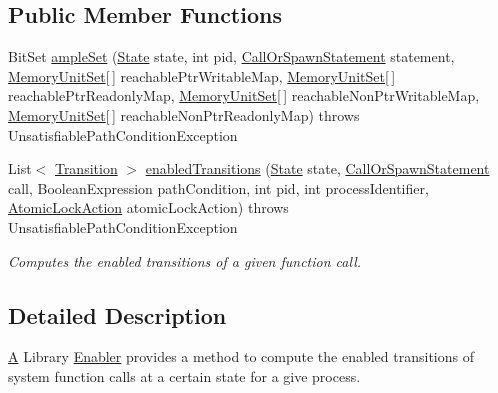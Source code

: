 \subsection*{Public Member Functions}
\begin{DoxyCompactItemize}
\item 
Bit\+Set \hyperlink{interfaceedu_1_1udel_1_1cis_1_1vsl_1_1civl_1_1kripke_1_1IF_1_1LibraryEnabler_ae19c97894a80b1965211330453c9d34b}{ample\+Set} (\hyperlink{interfaceedu_1_1udel_1_1cis_1_1vsl_1_1civl_1_1state_1_1IF_1_1State}{State} state, int pid, \hyperlink{interfaceedu_1_1udel_1_1cis_1_1vsl_1_1civl_1_1model_1_1IF_1_1statement_1_1CallOrSpawnStatement}{Call\+Or\+Spawn\+Statement} statement, \hyperlink{interfaceedu_1_1udel_1_1cis_1_1vsl_1_1civl_1_1state_1_1IF_1_1MemoryUnitSet}{Memory\+Unit\+Set}\mbox{[}$\,$\mbox{]} reachable\+Ptr\+Writable\+Map, \hyperlink{interfaceedu_1_1udel_1_1cis_1_1vsl_1_1civl_1_1state_1_1IF_1_1MemoryUnitSet}{Memory\+Unit\+Set}\mbox{[}$\,$\mbox{]} reachable\+Ptr\+Readonly\+Map, \hyperlink{interfaceedu_1_1udel_1_1cis_1_1vsl_1_1civl_1_1state_1_1IF_1_1MemoryUnitSet}{Memory\+Unit\+Set}\mbox{[}$\,$\mbox{]} reachable\+Non\+Ptr\+Writable\+Map, \hyperlink{interfaceedu_1_1udel_1_1cis_1_1vsl_1_1civl_1_1state_1_1IF_1_1MemoryUnitSet}{Memory\+Unit\+Set}\mbox{[}$\,$\mbox{]} reachable\+Non\+Ptr\+Readonly\+Map)  throws Unsatisfiable\+Path\+Condition\+Exception
\item 
List$<$ \hyperlink{interfaceedu_1_1udel_1_1cis_1_1vsl_1_1civl_1_1semantics_1_1IF_1_1Transition}{Transition} $>$ \hyperlink{interfaceedu_1_1udel_1_1cis_1_1vsl_1_1civl_1_1kripke_1_1IF_1_1LibraryEnabler_a7048d9901abda3f7af09cf3827523471}{enabled\+Transitions} (\hyperlink{interfaceedu_1_1udel_1_1cis_1_1vsl_1_1civl_1_1state_1_1IF_1_1State}{State} state, \hyperlink{interfaceedu_1_1udel_1_1cis_1_1vsl_1_1civl_1_1model_1_1IF_1_1statement_1_1CallOrSpawnStatement}{Call\+Or\+Spawn\+Statement} call, Boolean\+Expression path\+Condition, int pid, int process\+Identifier, \hyperlink{enumedu_1_1udel_1_1cis_1_1vsl_1_1civl_1_1semantics_1_1IF_1_1Transition_1_1AtomicLockAction}{Atomic\+Lock\+Action} atomic\+Lock\+Action)  throws Unsatisfiable\+Path\+Condition\+Exception
\begin{DoxyCompactList}\small\item\em Computes the enabled transitions of a given function call. \end{DoxyCompactList}\end{DoxyCompactItemize}


\subsection{Detailed Description}
\hyperlink{structA}{A} Library \hyperlink{interfaceedu_1_1udel_1_1cis_1_1vsl_1_1civl_1_1kripke_1_1IF_1_1Enabler}{Enabler} provides a method to compute the enabled transitions of system function calls at a certain state for a give process. 

